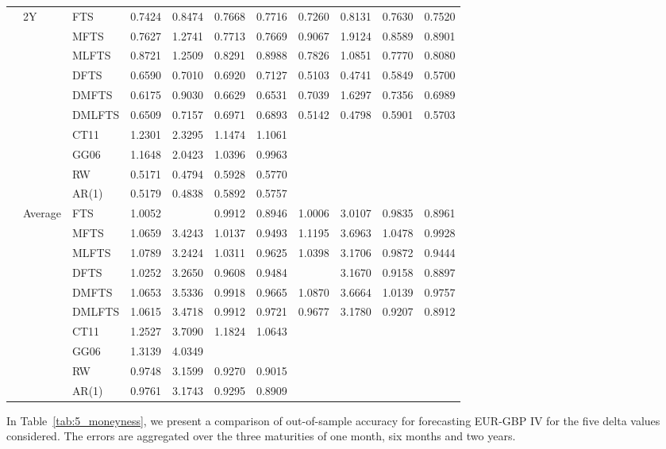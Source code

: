 \documentclass[12pt,a4paper]{article}
\def\textBF#1{\sbox\CBox{#1}\resizebox{\wd\CBox}{\ht\CBox}{\textbf{#1}}}
\begin{document}
\begin{center}
\begin{small}
\begin{longtable}{@{}lllcccccccc@{}}
 \cmidrule{2-11}
   & 2Y & FTS  & 0.7424 & 0.8474 & 0.7668 & 0.7716 & 0.7260 & 0.8131 & 0.7630 & 0.7520 \\ 
& & MFTS & 0.7627 & 1.2741 & 0.7713 & 0.7669 & 0.9067 & 1.9124 & 0.8589 & 0.8901 \\
& & MLFTS & 0.8721 & 1.2509 & 0.8291 & 0.8988 & 0.7826 & 1.0851 & 0.7770 & 0.8080 \\
& & DFTS & 0.6590 & 0.7010 & 0.6920 & 0.7127 & 0.5103 & 0.4741 & 0.5849 & 0.5700 \\ 
& & DMFTS & 0.6175 & 0.9030 & 0.6629 & 0.6531 & 0.7039 & 1.6297 & 0.7356 & 0.6989 \\
& & DMLFTS & 0.6509 & 0.7157 & 0.6971 & 0.6893 & 0.5142 & 0.4798 & 0.5901 & 0.5703 \\
& & CT11 & 1.2301 & 2.3295 & 1.1474 & 1.1061 \\
& & GG06 & 1.1648 & 2.0423 & 1.0396 & 0.9963 \\
& & RW & 0.5171 & 0.4794 & 0.5928 & 0.5770 \\
& & AR(1) & 0.5179 & 0.4838 & 0.5892 & 0.5757  \\
   \cmidrule{2-11}
   & Average & FTS & 1.0052 & \textBF{3.0043} & 0.9912 & 0.8946 & 1.0006 & 3.0107 & 0.9835 & 0.8961 \\
  & & MFTS & 1.0659 & 3.4243 & 1.0137 & 0.9493 & 1.1195  & 3.6963 & 1.0478 & 0.9928\\
  & & MLFTS & 1.0789 & 3.2424 & 1.0311 & 0.9625 & 1.0398 & 3.1706 & 0.9872 & 0.9444 \\
  & & DFTS &  1.0252 & 3.2650 & 0.9608 & 0.9484 & \textBF{0.9633} & 3.1670 & 0.9158 & 0.8897 \\
  & & DMFTS & 1.0653 & 3.5336 & 0.9918 & 0.9665 & 1.0870 & 3.6664 & 1.0139 & 0.9757 \\
  & & DMLFTS & 1.0615 & 3.4718 & 0.9912 & 0.9721 & 0.9677 & 3.1780 & 0.9207 & 0.8912 \\
& & CT11 & 1.2527 & 3.7090 & 1.1824 & 1.0643 \\
& & GG06 & 1.3139 & 4.0349 & \textBF{0.9157} & \textBF{0.8473} \\
& & RW & 0.9748 & 3.1599 & 0.9270 & 0.9015 \\
& & AR(1) & 0.9761 & 3.1743 & 0.9295 & 0.8909\\
  \bottomrule
\end{longtable}
\end{small}
\end{center}

In Table~\ref{tab:5_moneyness}, we present a comparison of out-of-sample accuracy for forecasting EUR-GBP IV for the five delta values considered. The errors are aggregated over the three maturities of one month, six months and two years.
\end{document}
